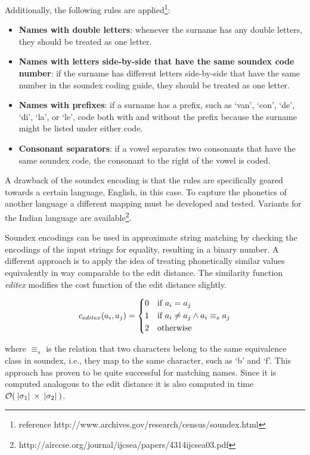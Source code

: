 Additionally, the following rules are applied\footnote{reference http://www.archives.gov/research/census/soundex.html}:

\begin{itemize}
    \item \textbf{Names with double letters}: whenever the surname has any double letters, they should be treated as one letter.
    \item \textbf{Names with letters side-by-side that have the same soundex code number}: if the surname has different letters side-by-side that have the same number in the soundex coding guide, they should be treated as one letter.
    \item \textbf{Names with prefixes}: if a surname has a prefix, such as `van', `con', `de', `di', `la', or `le', code both with and without the prefix because the surname might be listed under either code.
    \item \textbf{Consonant separators}: if a vowel separates two consonants that have the same soundex code, the consonant to the right of the vowel is coded.
\end{itemize}

A drawback of the soundex encoding is that the rules are specifically geared towards a certain language, English, in this case.
To capture the phonetics of another language a different mapping must be developed and tested.
Variants for the Indian language are available\footnote{http://airccse.org/journal/ijcsea/papers/4314ijcsea03.pdf}.

Soundex encodings can be used in approximate string matching by checking the encodings of the input strings for equality, resulting in a binary number.
A different approach is to apply the idea of treating phonetically similar values equivalently in way comparable to the edit distance.
The similarity function \emph{editex} modifies the cost function of the edit distance slightly.

\begin{equation}
    c_{editex}(a_i, a_j) =
    \begin{dcases}
        0 & \text{if } a_i = a_j \\
        1 & \text{if } a_i \neq a_j \wedge a_i \equiv_s a_j \\
        2 & \text{otherwise}
    \end{dcases}
\end{equation}

\noindent where $\equiv_s$ is the relation that two characters belong to the same equivalence class in soundex, i.e., they map to the same character, such as `b' and `f'.
This approach has proven to be quite successful for matching names\citep{Zobel1996}.
Since it is computed analogous to the edit distance it is also computed in time $\mathcal{O}(\:\vert {\sigma_1} \vert\: \times \:\vert {\sigma_2} \vert\:)$.


